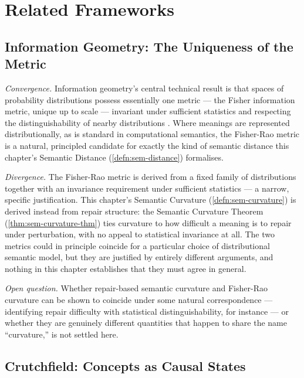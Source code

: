 \documentclass[12pt,twoside,openright]{book}
\begin{document}
\section{Related Frameworks}
\label{sec:ch20-related-frameworks}

\subsection*{Information Geometry: The Uniqueness of the Metric}

\emph{Convergence.} Information geometry's central technical
result is that spaces of probability distributions possess
essentially one metric --- the Fisher information metric, unique
up to scale --- invariant under sufficient statistics and
respecting the distinguishability of nearby distributions
\parencite{amari2016,ay2017}. Where meanings are represented
distributionally, as is standard in computational semantics, the
Fisher-Rao metric is a natural, principled candidate for exactly
the kind of semantic distance this chapter's Semantic Distance
(\cref{defn:sem-distance}) formalises.

\emph{Divergence.} The Fisher-Rao metric is derived from a fixed
family of distributions together with an invariance requirement
under sufficient statistics --- a narrow, specific justification.
This chapter's Semantic Curvature (\cref{defn:sem-curvature}) is
derived instead from repair structure: the Semantic Curvature
Theorem (\cref{thm:sem-curvature-thm}) ties curvature to how
difficult a meaning is to repair under perturbation, with no
appeal to statistical invariance at all. The two metrics could in
principle coincide for a particular choice of distributional
semantic model, but they are justified by entirely different
arguments, and nothing in this chapter establishes that they must
agree in general.

\emph{Open question.} Whether repair-based semantic curvature and
Fisher-Rao curvature can be shown to coincide under some natural
correspondence --- identifying repair difficulty with statistical
distinguishability, for instance --- or whether they are
genuinely different quantities that happen to share the name
``curvature,'' is not settled here.

\subsection*{Crutchfield: Concepts as Causal States}
\end{document}
